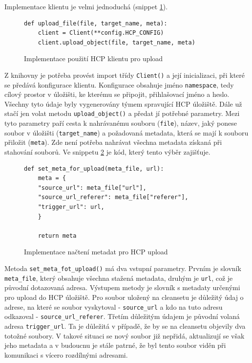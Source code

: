 \documentclass[thesis=M,czech,hidelinks]{FITthesis}[2013/05/06]
\begin{document}
Implementace klientu je velmi jednoduchá (snippet \ref{snip:hcpupload}).
\begin{figure}[h]               
	\begin{verbatim}
def upload_file(file, target_name, meta):
    client = Client(**config.HCP_CONFIG)
    client.upload_object(file, target_name, meta)
	\end{verbatim}      
	\caption{Implementace použití HCP klientu pro upload}
	\label{snip:hcpupload}
\end{figure}
Z knihovny je potřeba provést import třídy \texttt{Client()} a její inicializaci, při které se předává konfigurace klientu. Konfigurace obsahuje jméno \texttt{namespace}, tedy cílový prostor v úložišti, ke kterému se připojit, přihlašovací jméno a heslo. Všechny tyto údaje byly vygenerovány týmem spravující HCP úložiště. Dále už stačí jen volat metodu \texttt{upload_object()} a předat jí potřebné parametry. Mezi tyto parametry paří cesta k nahrávanému souboru (\texttt{file}), název, jaký ponese soubor v úložišti (\texttt{target_name}) a požadovaná metadata, která se mají k souboru přiložit (\texttt{meta}). Zde není potřeba nahrávat všechna metadata získaná při stahování souborů. Ve snippetu \ref{snip:metaupload} je kód, který tento výběr zajišťuje.

\begin{figure}[h]               
	\begin{verbatim}
def set_meta_for_upload(meta_file, url):
    meta = {
    "source_url": meta_file["url"],
    "source_url_referer": meta_file["referer"],
    "trigger_url": url,
    }
	
    return meta
	\end{verbatim}      
	\caption{Implementace načtení metadat pro HCP upload}
	\label{snip:metaupload}
\end{figure}

Metoda \texttt{set_meta_fot_upload()} má dva vstupní parametry. Prvním je slovník \texttt{meta_file}, který obsahuje všechna stažená metadata, druhým je \texttt{url}, což je původní dotazovaná adresa. Výstupem metody je slovník s metadaty určenými pro upload do HCP úložiště. Pro soubor uložený na cleansetu je důležitý údaj o adrese, na které se soubor vyskytoval - \texttt{source_url} a kdo na tuto adresu odkazoval - \texttt{source_url_referer}. Třetím důležitým údajem je původní volaná adresa \texttt{trigger_url}. Ta je důležitá v případě, že by se na cleansetu objevily dva totožné soubory. V takové situaci se nový soubor již nepřidá, aktualizují se však jeho metadata a v budoucnu je stále patrné, že byl tento soubor viděn při komunikaci s vícero rozdílnými adresami.
\end{document}
